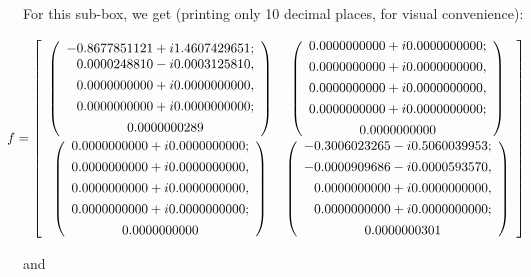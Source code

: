 For this sub-box, we get (printing only 10 decimal places,
for visual convenience):
\begin{small}
$$  \hskip-12pt
f = \left[\begin{array}{cc}
  \left(\begin{array}{c}
    -0.8677851121   + i 1.4607429651;\cr
   \phantom{-} 0.0000248810   - i 0.0003125810,\\[4pt]
   \phantom{-} 0.0000000000   + i 0.0000000000,\\[4pt]
   \phantom{-} 0.0000000000   + i 0.0000000000;\\[4pt]
   \phantom{-} 0.0000000289
 \end{array}\right)
 &
  \left(\begin{array}{c}
    0.0000000000 + i 0.0000000000;\\[4pt]
    0.0000000000 + i 0.0000000000,\\[4pt]
    0.0000000000 + i 0.0000000000,\\[4pt]
    0.0000000000 + i 0.0000000000;\\[4pt]
    0.0000000000
  \end{array}\right)
 \\[12pt] 
  \left(\begin{array}{c}
    0.0000000000 + i 0.0000000000;\\[4pt]
    0.0000000000 + i 0.0000000000,\\[4pt]
    0.0000000000 + i 0.0000000000,\\[4pt]
    0.0000000000 + i 0.0000000000;\\[4pt]
    0.0000000000
  \end{array} \right)
 &
  \left(\begin{array}{c}
    -0.3006023265 - i 0.5060039953;\\[4pt]
    -0.0000909686 - i 0.0000593570,\\[4pt]
   \phantom{-} 0.0000000000 + i 0.0000000000,\\[4pt]
   \phantom{-} 0.0000000000 + i 0.0000000000;\\[4pt]
   \phantom{-} 0.0000000301
  \end{array}\right)
\end{array}\right]
$$\end{small} 
and
